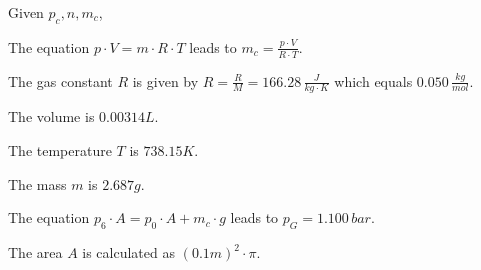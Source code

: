 Given \( p_c, n, m_c \),

The equation \( p \cdot V = m \cdot R \cdot T \) leads to \( m_c = \frac{p \cdot V}{R \cdot T} \).

The gas constant \( R \) is given by \( R = \frac{R}{M} = 166.28 \, \frac{J}{kg \cdot K} \) which equals \( 0.050 \, \frac{kg}{mol} \).

The volume is \( 0.00314L \).

The temperature \( T \) is \( 738.15K \).

The mass \( m \) is \( 2.687g \).

The equation \( p_6 \cdot A = p_0 \cdot A + m_c \cdot g \) leads to \( p_G = 1.100 \, bar \).

The area \( A \) is calculated as \( (0.1m)^2 \cdot \pi \).